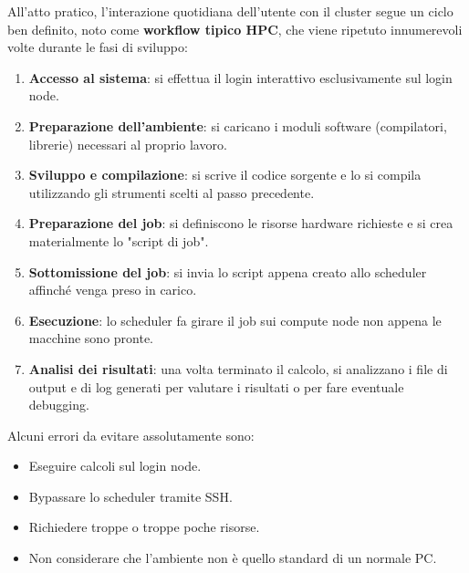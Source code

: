 All'atto pratico, l'interazione quotidiana dell'utente con il cluster segue un ciclo ben definito, noto come \textbf{workflow tipico HPC}, che viene ripetuto innumerevoli volte durante le fasi di sviluppo:
\begin{enumerate}
    \item \textbf{Accesso al sistema}: si effettua il login interattivo esclusivamente sul login node.
    \item \textbf{Preparazione dell'ambiente}: si caricano i moduli software (compilatori, librerie) necessari al proprio lavoro.
    \item \textbf{Sviluppo e compilazione}: si scrive il codice sorgente e lo si compila utilizzando gli strumenti scelti al passo precedente.
    \item \textbf{Preparazione del job}: si definiscono le risorse hardware richieste e si crea materialmente lo "script di job".
    \item \textbf{Sottomissione del job}: si invia lo script appena creato allo scheduler affinché venga preso in carico.
    \item \textbf{Esecuzione}: lo scheduler fa girare il job sui compute node non appena le macchine sono pronte.
    \item \textbf{Analisi dei risultati}: una volta terminato il calcolo, si analizzano i file di output e di log generati per valutare i risultati o per fare eventuale debugging.
\end{enumerate}

Alcuni errori da evitare assolutamente sono:
\begin{itemize}
    \item Eseguire calcoli sul login node.
    \item Bypassare lo scheduler tramite SSH.
    \item Richiedere troppe o troppe poche risorse.
    \item Non considerare che l'ambiente non è quello standard di un normale PC.
\end{itemize}